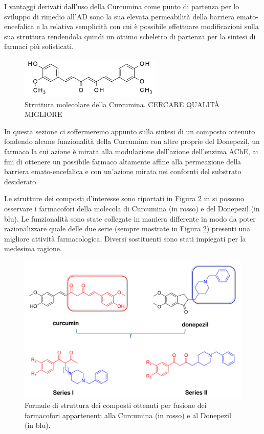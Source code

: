 \documentclass[a4paper, 12pt]{article}
\begin{document}
I vantaggi derivati dall'uso della Curcumina come punto di partenza per lo sviluppo di rimedio all'AD sono la sua elevata permeabilità della barriera emato-encefalica e la relativa semplicità con cui è possibile effettuare modificazioni sulla sua struttura rendendola quindi un ottimo scheletro di partenza per la sintesi di farmaci più sofisticati. \cite{jabir_cholinesterase_2018, jiang_traditional_2017}

\begin{figure}[H]
	\centering
	\includegraphics[width=.6\linewidth]{immagini/curcumina.png}
	\caption{Struttura molecolare della Curcumina. CERCARE QUALITÀ MIGLIORE}
	\label{fig:curcumina}
\end{figure}

In questa sezione ci soffermeremo appunto sulla sintesi di un composto ottenuto fondendo alcune funzionalità della Curcumina con altre proprie del Donepezil, un farmaco la cui azione è mirata alla modulazione dell'azione dell'enzima AChE, ai fini di ottenere un possibile farmaco altamente affine alla permeazione della barriera emato-encefalica e con un'azione mirata nei confornti del substrato desiderato.

Le strutture dei composti d'interesse sono riportati in Figura \ref{fig:generale_curcdone} in si possono osservare i farmacofori della molecola di Curcumina (in rosso) e del Donepezil (in blu). Le funzionalità sono state collegate in maniera differente in modo da poter razionalizzare quale delle due serie (sempre mostrate in Figura \ref{fig:generale_curcdone}) presenti una migliore attività farmacologica. Diversi sostituenti sono stati impiegati per la medesima ragione.

\begin{figure}[H]
	\centering
	\includegraphics[width=\linewidth]{immagini/generale_curcdone.png}
	\caption{Formule di struttura dei composti ottenuti per fusione dei farmacofori appartenenti alla Curcumina (in rosso) e al Donepezil (in blu).}
	\label{fig:generale_curcdone}
\end{figure}
\end{document}
